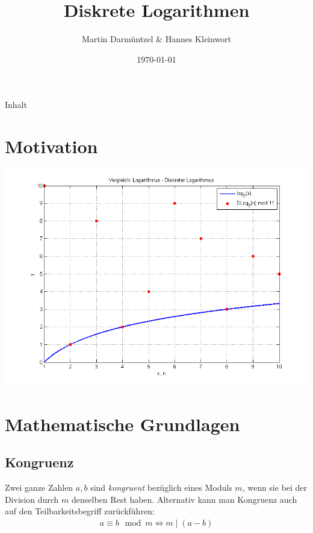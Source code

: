 \documentclass[utf8]{beamer}
\begin{document}
\title[]{Diskrete Logarithmen}
\author{Martin Darmüntzel \& Hannes Kleinwort}
\date{\today}

\begin{frame}
  \titlepage{}
\end{frame}

\begin{frame}[t]{Inhalt}
  \tableofcontents
\end{frame}

\section{Motivation}
\label{sec:motivation}

\begin{frame}{\insertsectionhead}
  \begin{center}
    \includegraphics[width=\textwidth]{log_discLog.png}
  \end{center}
\end{frame}

\section{Mathematische Grundlagen}
\label{sec:mathematische_grundlagen}

\subsection{Kongruenz}
\label{sub:kongruenz}

\begin{frame}{\insertsubsectionhead}
  Zwei ganze Zahlen $a, b$ sind \emph{kongruent} bezüglich eines Moduls $m$,
  wenn sie bei der Division durch $m$ denselben Rest haben. Alternativ kann man
  Kongruenz auch auf den Teilbarkeitsbegriff zurückführen:
  \begin{align*}
    a \equiv b \mod m \Leftrightarrow m \mid (a - b)
  \end{align*}
\end{frame}
\end{document}

